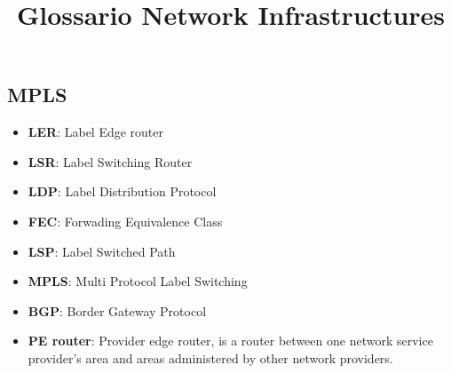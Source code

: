 \documentclass[12pt]{article}
\title{\textbf{Glossario Network Infrastructures}}
\date{}
\begin{document}
\maketitle

\subsection*{MPLS}
\begin{itemize}
    \item {\bf{LER}}:  Label Edge router
    \item {\bf{LSR}}: Label Switching Router
    \item {\bf{LDP}}: Label Distribution Protocol
    \item {\bf{FEC}}: Forwading Equivalence Class
    \item {\bf{LSP}}: Label Switched Path
    \item {\bf{MPLS}}: Multi Protocol Label Switching
    \item {\bf{BGP}}: Border Gateway Protocol
    \item {\bf{PE router}}: Provider edge router, is a router between one network service provider's area and areas administered by other network providers. 
\end{itemize}
\end{document}
